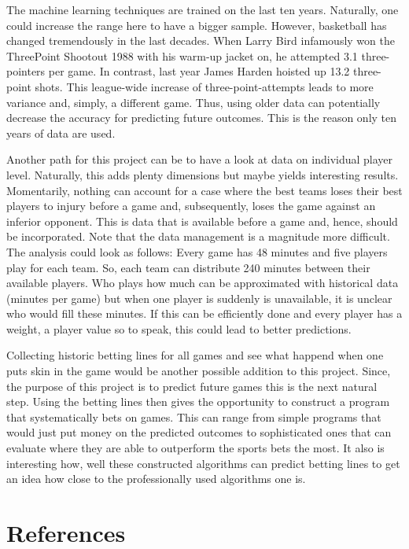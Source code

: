 \documentclass[11pt,a4paper,leqno]{article}
\begin{document}
The machine learning techniques are trained on the last ten years. Naturally, one could increase the range here to have a bigger sample. However, basketball has changed tremendously in the last decades. When Larry Bird infamously won the Three\-Point Shootout 1988 with his warm-up jacket on, he attempted 3.1 three-pointers per game. In contrast, last year James Harden hoisted up 13.2 three-point shots. This league-wide increase of three-point-attempts leads to more variance and, simply, a different game. Thus, using older data can potentially decrease the accuracy for predicting future outcomes. This is the reason only ten years of data are used.

Another path for this project can be to have a look at data on individual player level. Naturally, this adds plenty dimensions but maybe yields interesting results. Momentarily, nothing can account for a case where the best teams loses their best players to injury before a game and, subsequently, loses the game against an inferior opponent. This is data that is available before a game and, hence, should be incorporated. Note that the data management is a magnitude more difficult. The analysis could look as follows: Every game has 48 minutes and five players play for each team. So, each team can distribute 240 minutes between their available players. Who plays how much can be approximated with historical data (minutes per game) but when one player is suddenly is unavailable, it is unclear who would fill these minutes. If this can be efficiently done and every player has a weight, a player value so to speak, this could lead to better predictions.

Collecting historic betting lines for all games and see what happend when one puts skin in the game would be another possible addition to this project. Since, the purpose of this project is to predict future games this is the next natural step. Using the betting lines then gives the opportunity to construct a program that systematically bets on games. This can range from simple programs that would just put money on the predicted outcomes to sophisticated ones that can evaluate where they are able to outperform the sports bets the most. It also is interesting how, well these constructed algorithms can predict betting lines to get an idea how close to the professionally used algorithms one is.

\section{References}

\printbibliography
\end{document}
